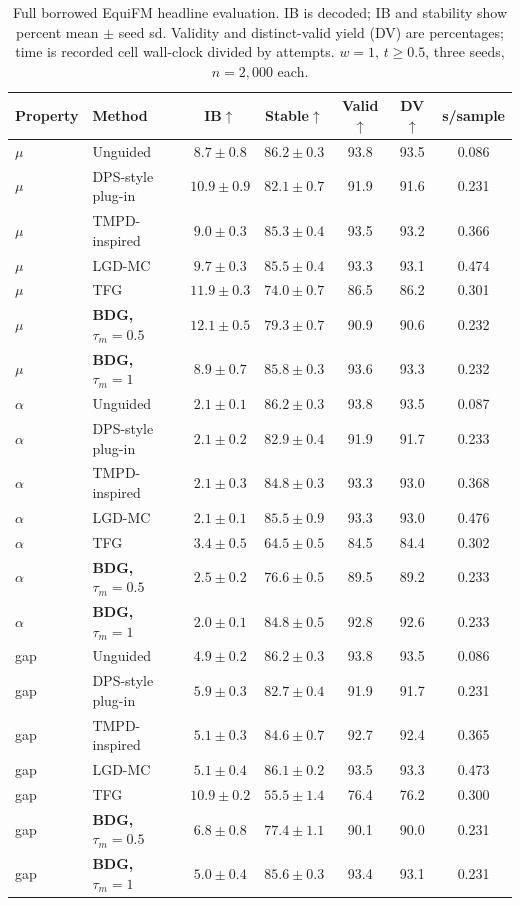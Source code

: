 \documentclass{article}
\begin{document}
\clearpage
\begin{table}[!htbp]
\centering\small
\caption{Full borrowed EquiFM headline evaluation. IB is decoded; IB and stability show percent mean $\pm$ seed sd. Validity and distinct-valid yield (DV) are percentages; time is recorded cell wall-clock divided by attempts. $w=1$, $t\ge0.5$, three seeds, $n=2{,}000$ each.}
\label{tab:full-equifm}
\begin{tabular}{llccccc}
\toprule
Property & Method & IB$\uparrow$ & Stable$\uparrow$ & Valid$\uparrow$ & DV$\uparrow$ & s/sample\\
\midrule
$\mu$ & Unguided & $8.7\pm0.8$ & $86.2\pm0.3$ & 93.8 & 93.5 & 0.086\\
$\mu$ & DPS-style plug-in & $10.9\pm0.9$ & $82.1\pm0.7$ & 91.9 & 91.6 & 0.231\\
$\mu$ & TMPD-inspired & $9.0\pm0.3$ & $85.3\pm0.4$ & 93.5 & 93.2 & 0.366\\
$\mu$ & LGD-MC & $9.7\pm0.3$ & $85.5\pm0.4$ & 93.3 & 93.1 & 0.474\\
$\mu$ & TFG & $11.9\pm0.3$ & $74.0\pm0.7$ & 86.5 & 86.2 & 0.301\\
$\mu$ & \textbf{BDG, $\tau_m=0.5$} & $12.1\pm0.5$ & $79.3\pm0.7$ & 90.9 & 90.6 & 0.232\\
$\mu$ & \textbf{BDG, $\tau_m=1$} & $8.9\pm0.7$ & $85.8\pm0.3$ & 93.6 & 93.3 & 0.232\\
\midrule
$\alpha$ & Unguided & $2.1\pm0.1$ & $86.2\pm0.3$ & 93.8 & 93.5 & 0.087\\
$\alpha$ & DPS-style plug-in & $2.1\pm0.2$ & $82.9\pm0.4$ & 91.9 & 91.7 & 0.233\\
$\alpha$ & TMPD-inspired & $2.1\pm0.3$ & $84.8\pm0.3$ & 93.3 & 93.0 & 0.368\\
$\alpha$ & LGD-MC & $2.1\pm0.1$ & $85.5\pm0.9$ & 93.3 & 93.0 & 0.476\\
$\alpha$ & TFG & $3.4\pm0.5$ & $64.5\pm0.5$ & 84.5 & 84.4 & 0.302\\
$\alpha$ & \textbf{BDG, $\tau_m=0.5$} & $2.5\pm0.2$ & $76.6\pm0.5$ & 89.5 & 89.2 & 0.233\\
$\alpha$ & \textbf{BDG, $\tau_m=1$} & $2.0\pm0.1$ & $84.8\pm0.5$ & 92.8 & 92.6 & 0.233\\
\midrule
gap & Unguided & $4.9\pm0.2$ & $86.2\pm0.3$ & 93.8 & 93.5 & 0.086\\
gap & DPS-style plug-in & $5.9\pm0.3$ & $82.7\pm0.4$ & 91.9 & 91.7 & 0.231\\
gap & TMPD-inspired & $5.1\pm0.3$ & $84.6\pm0.7$ & 92.7 & 92.4 & 0.365\\
gap & LGD-MC & $5.1\pm0.4$ & $86.1\pm0.2$ & 93.5 & 93.3 & 0.473\\
gap & TFG & $10.9\pm0.2$ & $55.5\pm1.4$ & 76.4 & 76.2 & 0.300\\
gap & \textbf{BDG, $\tau_m=0.5$} & $6.8\pm0.8$ & $77.4\pm1.1$ & 90.1 & 90.0 & 0.231\\
gap & \textbf{BDG, $\tau_m=1$} & $5.0\pm0.4$ & $85.6\pm0.3$ & 93.4 & 93.1 & 0.231\\
\bottomrule
\end{tabular}
\end{table}
\end{document}

